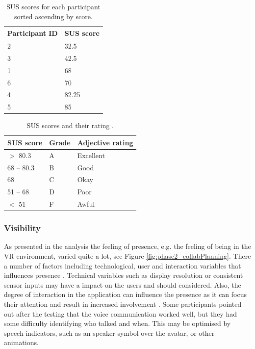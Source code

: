 \begin{table}[H]
\centering
\begin{tabular}{l|l}
{ \textbf{Participant ID}} & { \textbf{SUS score}} \\ \hline
2   & 32.5                                     \\ 
3   & 42.5                                    \\ 
1   & 68                                   \\ 
6   & 70                                     \\ 
4   & 82.25                                    \\ 
5   & 85                                     \\ 
\end{tabular}
\caption{SUS scores for each participant sorted ascending by score.}
\label{table:SUSscores}
\end{table}


\begin{table}[H]
\centering
\begin{tabular}{l|l|l}
{ \textbf{SUS score}} & { \textbf{Grade}} & { \textbf{Adjective rating}} \\ \hline
$>$ 80.3   & A &  Excellent                                 \\ 
68 – 80.3   & B & Good                                  \\ 
68   & C   &   Okay                              \\ 
51 – 68   & D   &  Poor                               \\ 
$<$ 51  & F      &     Awful                         \\ 
\end{tabular}
\caption{SUS scores and their rating \cite{SusMeasuringInterpret}.}
\label{table:SUSinterpret}
\end{table}



\subsubsection{Visibility}
\label{section:phase2visibility}
As presented in the analysis the feeling of presence, e.g. the feeling of being in the VR environment, varied quite a lot, see Figure \ref{fig:phase2_collabPlanning}. There a number of factors including technological, user and interaction variables that influences presence \cite{oh2018systematic} \cite{presenceInVirtualReality:}. Technical variables such as display resolution or consistent sensor inputs may have a impact on the users and should considered. Also, the degree of interaction in the application can influence the presence as it can focus their attention and result in increased involvement \cite{presenceInVirtualReality:}. 
Some participants pointed out after the testing that the voice communication worked well, but they had some difficulty identifying who talked and when. This may be optimised by speech indicators, such as an speaker symbol over the avatar, or other animations.     

